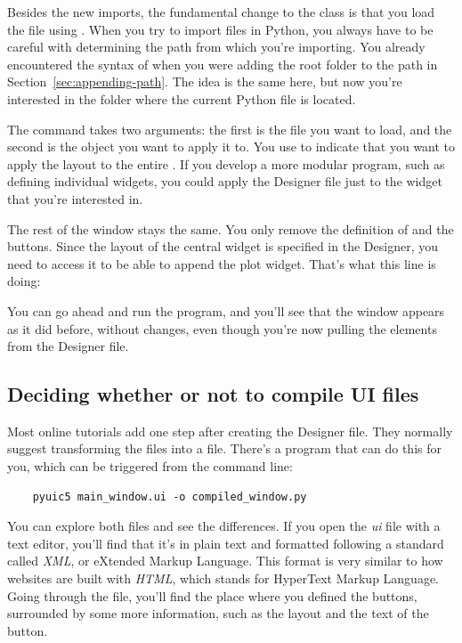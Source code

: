 Besides the new imports, the fundamental change to the  class is that you load the file using . When you try to import files in Python, you always have to be careful with determining the path from which you're importing. You already encountered the syntax of  when you were adding the root folder to the path in Section~\ref{sec:appending-path}. The idea is the same here, but now you're interested in the folder where the current Python file is located.

The command  takes two arguments: the first is the file you want to load, and the second is the object you want to apply it to. You use  to indicate that you want to apply the layout to the entire . If you develop a more modular program, such as defining individual widgets, you could apply the Designer file just to the widget that you're interested in.

The rest of the window stays the same. You only remove the definition of  and the buttons. Since the layout of the central widget is specified in the Designer, you need to access it to be able to append the plot widget. That's what this line is doing:


You can go ahead and run the program, and you'll see that the window appears as it did before, without changes, even though you're now pulling the elements from the Designer file.

\subsection{Deciding whether or not to compile UI files}\label{subsec:compiling-or-not-compiling-ui-files}
Most online tutorials add one step after creating the Designer file. They normally suggest transforming the  files into a  file. There's a program that can do this for you, which can be triggered from the command line:

\begin{verbatim}
    pyuic5 main_window.ui -o compiled_window.py
\end{verbatim}

You can explore both files and see the differences. If you open the \emph{ui} file with a text editor, you'll find that it's in plain text and formatted following a standard called \emph{XML}, or eXtended Markup Language. This format is very similar to how websites are built with \emph{HTML}, which stands for HyperText Markup Language. Going through the file, you'll find the place where you defined the buttons, surrounded by some more information, such as the layout and the text of the button.

